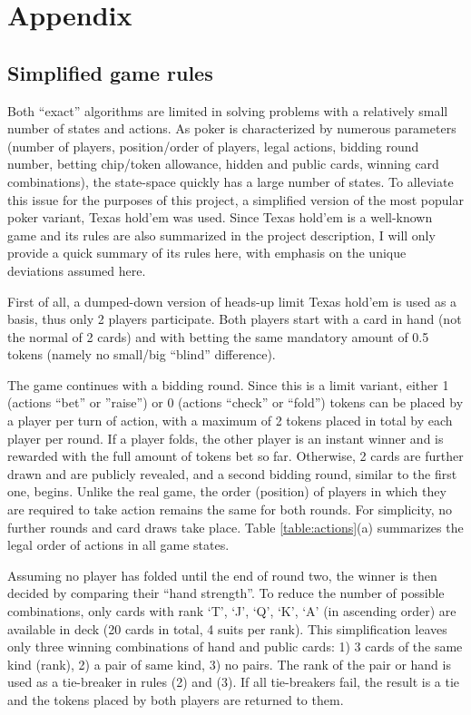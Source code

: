 \clearpage

\section*{Appendix}

\subsection*{Simplified game rules}

Both ``exact'' algorithms are limited in solving problems with a relatively small number of states and actions. As poker is characterized by numerous parameters (number of players, position/order of players, legal actions, bidding round number, betting chip/token allowance, hidden and public cards, winning card combinations), the state-space quickly has a large number of states. To alleviate this issue for the purposes of this project, a simplified version of the most popular poker variant, Texas hold'em was used. Since Texas hold'em is a well-known game and its rules are also summarized in the project description, I will only provide a quick summary of its rules here, with emphasis on the unique deviations assumed here.

First of all, a dumped-down version of heads-up limit Texas hold'em is used as a basis, thus only 2 players participate. Both players start with a card in hand (not the normal of 2 cards) and with betting the same mandatory amount of 0.5 tokens (namely no small/big ``blind'' difference). 

The game continues with a bidding round. Since this is a limit variant, either 1 (actions ``bet'' or ''raise'') or 0 (actions ``check'' or ``fold'') tokens can be placed by a player per turn of action, with a maximum of 2 tokens placed in total by each player per round. If a player folds, the other player is an instant winner and is rewarded with the full amount of tokens bet so far. Otherwise, 2 cards are further drawn and are publicly revealed, and a second bidding round, similar to the first one, begins. Unlike the real game, the order (position) of players in which they are required to take action remains the same for both rounds. For simplicity, no further rounds and card draws take place. Table \ref{table:actions}(a) summarizes the legal order of actions in all game states.

Assuming no player has folded until the end of round two, the winner is then decided by comparing their ``hand strength''. To reduce the number of possible combinations, only cards with rank `T', `J', `Q', `K', `A' (in ascending order) are available in deck (20 cards in total, 4 suits per rank). This simplification leaves only three winning combinations of hand and public cards: 1) 3 cards of the same kind (rank), 2) a pair of same kind, 3) no pairs. The rank of the pair or hand is used as a tie-breaker in rules (2) and (3). If all tie-breakers fail, the result is a tie and the tokens placed by both players are returned to them.

